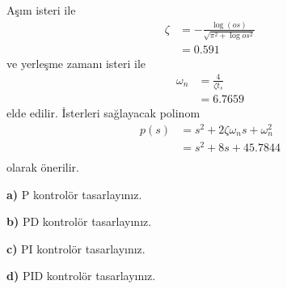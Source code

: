 Aşım isteri ile 
\begin{equation}
\begin{split}
    \zeta&=-\frac{\log(os)}{\sqrt{\pi^2+\log{os}^2}}\\
    &=0.591
\end{split}
\end{equation}
ve yerleşme zamanı isteri ile 
\begin{equation}
\begin{split}
    \omega_n&=\frac{4}{\zeta t_s}\\
    &=6.7659
\end{split}
\end{equation}
elde edilir. İsterleri sağlayacak polinom
\begin{equation}
\begin{split}
    p(s)&=s^2+2\zeta \omega_n s+\omega_n^2\\
    &=s^2+8s+45.7844\\
\end{split}
\end{equation}
olarak önerilir.

\noindent\textbf{a)} P kontrolör tasarlayınız.

\clearpage

\noindent\textbf{b)} PD kontrolör tasarlayınız.

\clearpage

\noindent\textbf{c)} PI kontrolör tasarlayınız.

\clearpage

\noindent\textbf{d)} PID kontrolör tasarlayınız.

